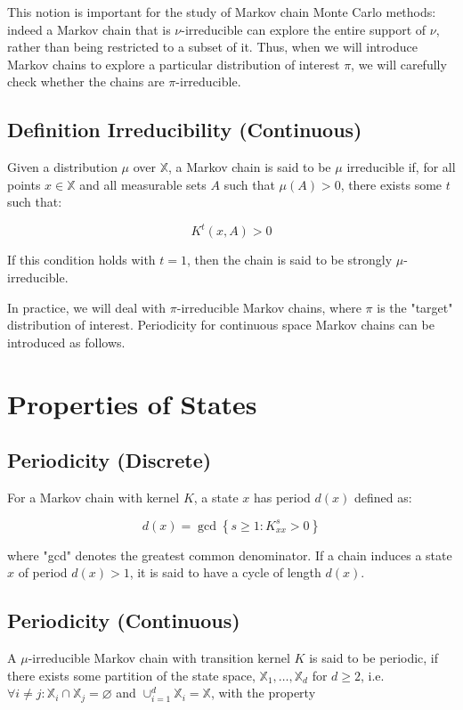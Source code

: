\documentclass[10pt]{article}
\begin{document}
This notion is important for the study of Markov chain Monte Carlo methods: indeed a Markov chain that is $\nu$-irreducible can explore the entire support of $\nu$, rather than being restricted to a subset of it. Thus, when we will introduce Markov chains to explore a particular distribution of interest $\pi$, we will carefully check whether the chains are $\pi$-irreducible.

\subsection{Definition Irreducibility (Continuous)}
Given a distribution $\mu$ over $\mathbb{X}$, a Markov chain is said to be $\mu$ irreducible if, for all points $x \in \mathbb{X}$ and all measurable sets $A$ such that $\mu(A)>0$, there exists some $t$ such that:

$$
K^{t}(x, A)>0
$$

If this condition holds with $t=1$, then the chain is said to be strongly $\mu$-irreducible.

In practice, we will deal with $\pi$-irreducible Markov chains, where $\pi$ is the "target" distribution of interest. Periodicity for continuous space Markov chains can be introduced as follows.

\section{Properties of States}
\subsection{Periodicity (Discrete)}
For a Markov chain with kernel $K$, a state $x$ has period $d(x)$ defined as:

$$
d(x)=\operatorname{gcd}\left\{s \geq 1: K_{x x}^{s}>0\right\}
$$

where "gcd" denotes the greatest common denominator. If a chain induces a state $x$ of period $d(x)>1$, it is said to have a cycle of length $d(x)$.
\subsection{Periodicity (Continuous)}
A $\mu$-irreducible Markov chain with transition kernel $K$ is said to be periodic, if there exists some partition of the state space, $\mathbb{X}_{1}, \ldots, \mathbb{X}_{d}$ for $d \geq 2$, i.e. $\forall i \neq j: \mathbb{X}_{i} \cap \mathbb{X}_{j}=\varnothing$ and $\cup_{i=1}^{d} \mathbb{X}_{i}=\mathbb{X}$, with the property
\end{document}
